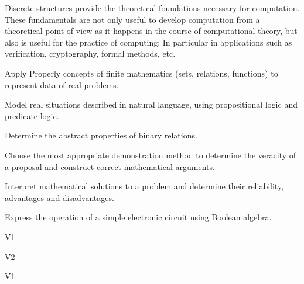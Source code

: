 \begin{syllabus}


\begin{justification}

Discrete structures provide the theoretical foundations necessary for computation. These fundamentals are not only useful to develop computation from a theoretical point of view as it happens 
in the course of computational theory, but also is useful for the practice of computing; In particular in applications such as verification,
cryptography, formal methods, etc.

\end{justification}

\begin{goals}
\item Apply Properly concepts of finite mathematics (sets, relations, functions) to represent data of real problems.
\item Model real situations described in natural language, using propositional logic and predicate logic.
\item Determine the abstract properties of binary relations.
\item Choose the most appropriate demonstration method to determine the veracity of a proposal and construct correct mathematical arguments.
\item Interpret mathematical solutions to a problem and determine their reliability, advantages and disadvantages.
\item Express the operation of a simple electronic circuit using Boolean algebra.
\end{goals}

\begin{outcomes}{V1}
    \item {}
    \item {}
\end{outcomes}

\begin{outcomes}{V2}
    \item {}
    \item {}
\end{outcomes}

\begin{competences}{V1}
    \item {}
    \item {}
\end{competences}


\end{syllabus}
